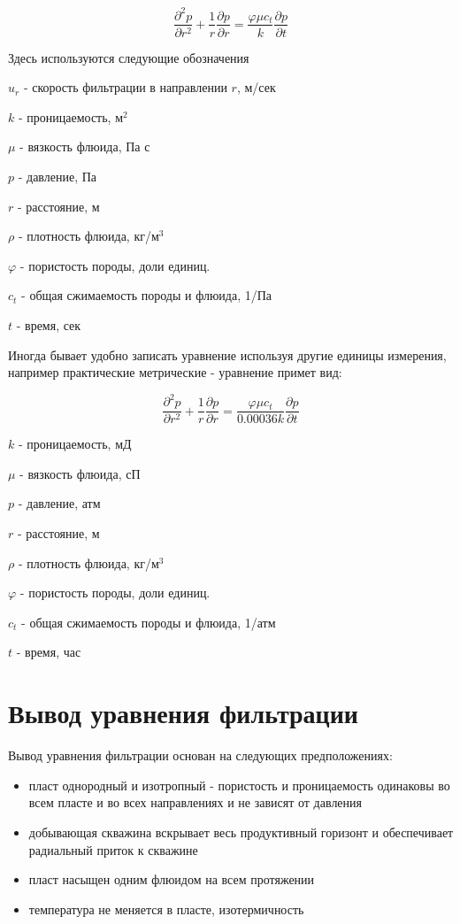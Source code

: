 \begin{equation} \label{eq:diff_eq_1} 
	\frac{\partial ^2 p }{\partial r^2} + \frac{1}{r} \frac{\partial p}{\partial r} = \frac{\varphi \mu c_t}{k} \frac{\partial p}{\partial t} 
\end{equation}

Здесь используются следующие обозначения

$u_r$ - скорость фильтрации в направлении $r$, м/сек

$k$ - проницаемость, м$^2$

$\mu$ - вязкость флюида, Па с

$p$ - давление, Па 

$r$ - расстояние, м 

$\rho$ - плотность флюида, кг/м$^3$

$\varphi$ - пористость породы, доли единиц.

$c_t$ - общая сжимаемость породы и флюида, 1/Па

$t$ - время, сек

Иногда бывает удобно записать уравнение используя другие единицы измерения, например практические метрические - уравнение примет вид:

\begin{equation} \label{eq:diff_eq_2} 
	\frac{\partial ^2 p }{\partial r^2} + \frac{1}{r} \frac{\partial p}{\partial r} = \frac{\varphi \mu c_t}{0.00036 k} \frac{\partial p}{\partial t} 
\end{equation}


$k$ - проницаемость, мД

$\mu$ - вязкость флюида, сП

$p$ - давление, атм 

$r$ - расстояние, м 

$\rho$ - плотность флюида, кг/м$^3$

$\varphi$ - пористость породы, доли единиц.

$c_t$ - общая сжимаемость породы и флюида, 1/атм

$t$ - время, час

\section{Вывод уравнения фильтрации}

Вывод уравнения фильтрации основан на следующих предположениях: 
\begin{itemize}
	\item пласт однородный и изотропный - пористость и проницаемость одинаковы во всем пласте и во всех направлениях и не зависят от давления 
	\item добывающая скважина вскрывает весь продуктивный горизонт и обеспечивает радиальный приток к скважине
	\item пласт насыщен одним флюидом на всем протяжении
	\item температура не меняется в пласте, изотермичность
\end{itemize}

